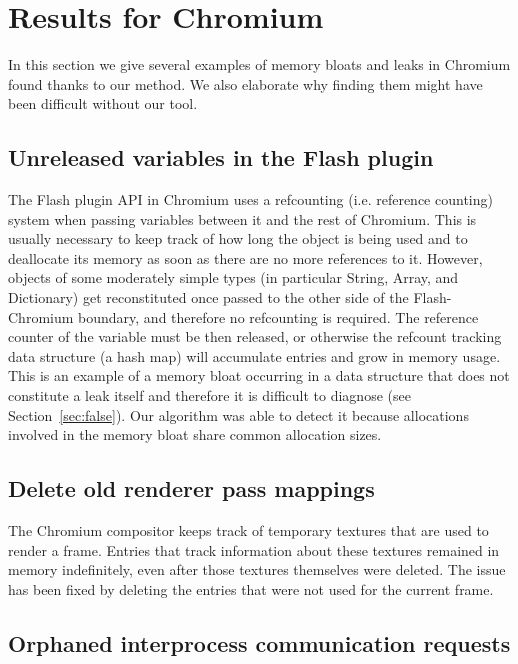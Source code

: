 \documentclass[preprint, numbers]{sigplanconf}
\begin{document}
\section{Results for Chromium}
\label{sec:results}

In this section we give several examples of memory bloats and leaks in Chromium found
thanks to our method.
We also elaborate why finding them might have been difficult without our tool.

\subsection{Unreleased variables in the Flash plugin \cite{cr-flash}}

The Flash plugin API in Chromium uses a refcounting (i.e. reference counting) system when passing variables between it and the rest of Chromium.
This is usually necessary to keep track of how long the object is being used and
to deallocate its memory as soon as there are no more references to it.
However, objects of some moderately simple types (in particular String, Array, and Dictionary)
get reconstituted once passed to the other side of the Flash-Chromium boundary, and therefore no refcounting is required.
The reference counter of the variable must be then released, or otherwise the refcount tracking data structure (a hash map) will accumulate entries and grow in memory usage.
This is an example of a memory bloat occurring in a data structure
that does not constitute a leak itself and therefore it is difficult to diagnose (see Section~\ref{sec:false}).
Our algorithm was able to detect it because allocations involved in the memory bloat share common allocation sizes.

\subsection{Delete old renderer pass mappings \cite{cr-mappings}}

The Chromium compositor keeps track of temporary textures that are used to render a frame.
Entries that track information about these textures remained in memory indefinitely, even after those textures themselves were deleted.
The issue has been fixed by deleting the entries that were not used for the current frame.

\subsection{Orphaned interprocess communication requests \cite{cr-orphaned}}
\end{document}
